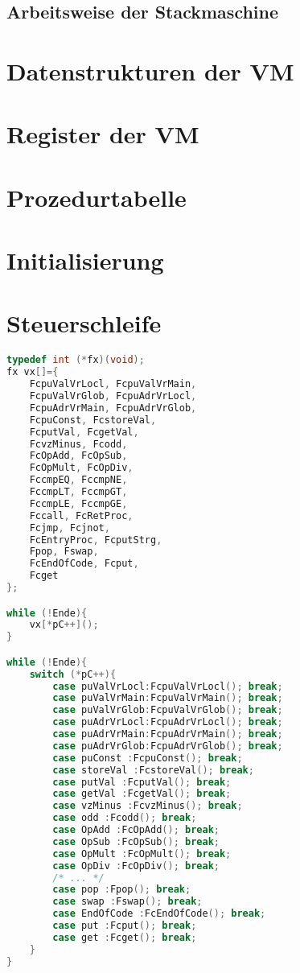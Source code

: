 \subsection{Arbeitsweise der Stackmaschine}

\section{Datenstrukturen der VM}

\section{Register der VM}

\section{Prozedurtabelle}

\section{Initialisierung}

\section{Steuerschleife}
\begin{lstlisting}[language=C]
typedef int (*fx)(void);
fx vx[]={
	FcpuValVrLocl, FcpuValVrMain,
	FcpuValVrGlob, FcpuAdrVrLocl,
	FcpuAdrVrMain, FcpuAdrVrGlob,
	FcpuConst, FcstoreVal,
	FcputVal, FcgetVal,
	FcvzMinus, Fcodd,
	FcOpAdd, FcOpSub,
	FcOpMult, FcOpDiv,
	FccmpEQ, FccmpNE,
	FccmpLT, FccmpGT,
	FccmpLE, FccmpGE,
	Fccall, FcRetProc,
	Fcjmp, Fcjnot,
	FcEntryProc, FcputStrg,
	Fpop, Fswap,
	FcEndOfCode, Fcput,
	Fcget
};

while (!Ende){
	vx[*pC++]();
}

while (!Ende){
	switch (*pC++){
		case puValVrLocl:FcpuValVrLocl(); break;
		case puValVrMain:FcpuValVrMain(); break;
		case puValVrGlob:FcpuValVrGlob(); break;
		case puAdrVrLocl:FcpuAdrVrLocl(); break;
		case puAdrVrMain:FcpuAdrVrMain(); break;
		case puAdrVrGlob:FcpuAdrVrGlob(); break;
		case puConst :FcpuConst(); break;
		case storeVal :FcstoreVal(); break;
		case putVal :FcputVal(); break;
		case getVal :FcgetVal(); break;
		case vzMinus :FcvzMinus(); break;
		case odd :Fcodd(); break;
		case OpAdd :FcOpAdd(); break;
		case OpSub :FcOpSub(); break;
		case OpMult :FcOpMult(); break;
		case OpDiv :FcOpDiv(); break;
		/* ... */
		case pop :Fpop(); break;
		case swap :Fswap(); break;
		case EndOfCode :FcEndOfCode(); break;
		case put :Fcput(); break;
		case get :Fcget(); break;
	}
}
\end{lstlisting}

